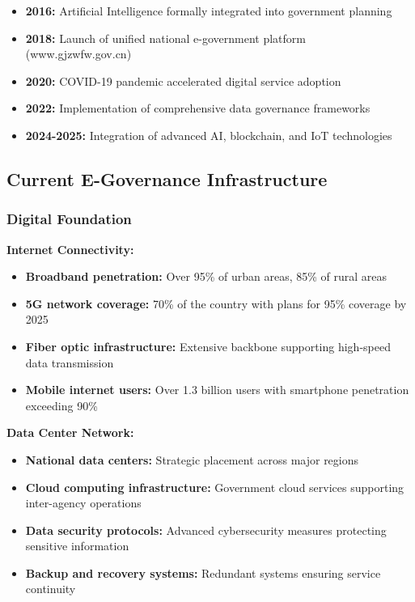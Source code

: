 \documentclass[12pt,a4paper]{article}
\begin{document}
\begin{itemize}
    \item \textbf{2016:} Artificial Intelligence formally integrated into government planning
    \item \textbf{2018:} Launch of unified national e-government platform (www.gjzwfw.gov.cn)
    \item \textbf{2020:} COVID-19 pandemic accelerated digital service adoption
    \item \textbf{2022:} Implementation of comprehensive data governance frameworks
    \item \textbf{2024-2025:} Integration of advanced AI, blockchain, and IoT technologies
\end{itemize}

\subsection{Current E-Governance Infrastructure}

\subsubsection{Digital Foundation}

\textbf{Internet Connectivity:}
\begin{itemize}
    \item \textbf{Broadband penetration:} Over 95\% of urban areas, 85\% of rural areas
    \item \textbf{5G network coverage:} 70\% of the country with plans for 95\% coverage by 2025
    \item \textbf{Fiber optic infrastructure:} Extensive backbone supporting high-speed data transmission
    \item \textbf{Mobile internet users:} Over 1.3 billion users with smartphone penetration exceeding 90\%
\end{itemize}

\textbf{Data Center Network:}
\begin{itemize}
    \item \textbf{National data centers:} Strategic placement across major regions
    \item \textbf{Cloud computing infrastructure:} Government cloud services supporting inter-agency operations
    \item \textbf{Data security protocols:} Advanced cybersecurity measures protecting sensitive information
    \item \textbf{Backup and recovery systems:} Redundant systems ensuring service continuity
\end{itemize}
\end{document}
